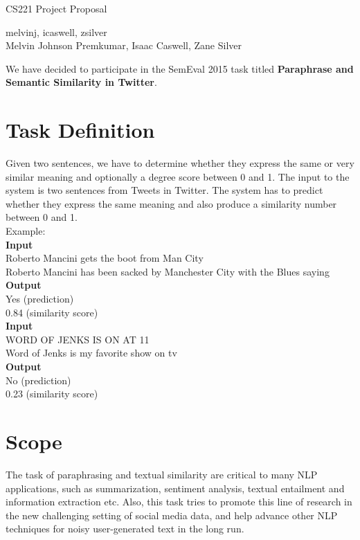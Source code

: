 \documentclass[10pt]{article}
\begin{document}
\begin{center}
{\Large CS221 Project Proposal}\\
\end{center}
\begin{center}
melvinj, icaswell, zsilver \\
Melvin Johnson Premkumar, Isaac Caswell, Zane Silver \\
\end{center}

We have decided to participate in the SemEval 2015 task titled \textbf{Paraphrase and Semantic Similarity in Twitter}.
\section{Task Definition}
\vspace{-0.1in}
Given two sentences, we have to determine whether they express the same or very similar meaning and optionally a degree score between 0 and 1. The input to the system is two sentences from Tweets in Twitter. The system has to predict whether they express the same meaning and also produce a similarity number between 0 and 1.\\

\noindent Example:\\
\textbf{Input}\\
Roberto Mancini gets the boot from Man City\\
Roberto Mancini has been sacked by Manchester City with the Blues saying\\
\textbf{Output}\\
Yes (prediction)\\
0.84 (similarity score)\\
\noindent \textbf{Input}\\
WORD OF JENKS IS ON AT 11\\
Word of Jenks is my favorite show on tv\\
\textbf{Output}\\
No (prediction)\\
0.23 (similarity score)\\
\vspace{-0.1in}
\section{Scope}
\vspace{-0.1in}
The task of paraphrasing and textual similarity are critical to many NLP applications, such as summarization, sentiment analysis, textual entailment and information extraction etc. Also, this task tries to promote this line of research in the new challenging setting of social media data, and help advance other NLP techniques for noisy user-generated text in the long run.
\end{document}
